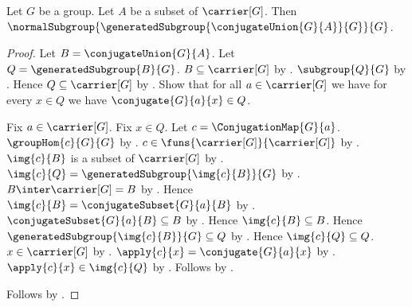 \begin{theorem}\label{generated_conjugate_union_is_normal_subgroup}
    Let $G$ be a group.
    Let $A$ be a subset of $\carrier[G]$.
    Then
        $\normalSubgroup
            {\generatedSubgroup{\conjugateUnion{G}{A}}{G}}{G}$.
\end{theorem}
\begin{proof}
    Let $B=\conjugateUnion{G}{A}$.
    Let $Q=\generatedSubgroup{B}{G}$.
    $B\subseteq\carrier[G]$ by
        .
    $\subgroup{Q}{G}$ by
        .
    Hence $Q\subseteq\carrier[G]$ by
        .
    Show that for all $a\in\carrier[G]$ we have for every $x\in Q$
        we have $\conjugate{G}{a}{x}\in Q$.
    \begin{subproof}
        Fix $a\in\carrier[G]$.
        Fix $x\in Q$.
        Let $c=\ConjugationMap{G}{a}$.
        $\groupHom{c}{G}{G}$ by
            .
        $c\in\funs{\carrier[G]}{\carrier[G]}$ by
            .
        $\img{c}{B}$ is a subset of $\carrier[G]$ by
            .
        $\img{c}{Q}=\generatedSubgroup{\img{c}{B}}{G}$ by
            .
        $B\inter\carrier[G]=B$ by
            .
        Hence $\img{c}{B}=\conjugateSubset{G}{a}{B}$ by
            .
        $\conjugateSubset{G}{a}{B}\subseteq B$ by
            .
        Hence $\img{c}{B}\subseteq B$.
        Hence
            $\generatedSubgroup{\img{c}{B}}{G}\subseteq Q$ by
            .
        Hence $\img{c}{Q}\subseteq Q$.
        $x\in\carrier[G]$ by .
        $\apply{c}{x}=\conjugate{G}{a}{x}$ by
            .
        $\apply{c}{x}\in\img{c}{Q}$ by
            .
        Follows by .
    \end{subproof}
    Follows by .
\end{proof}

